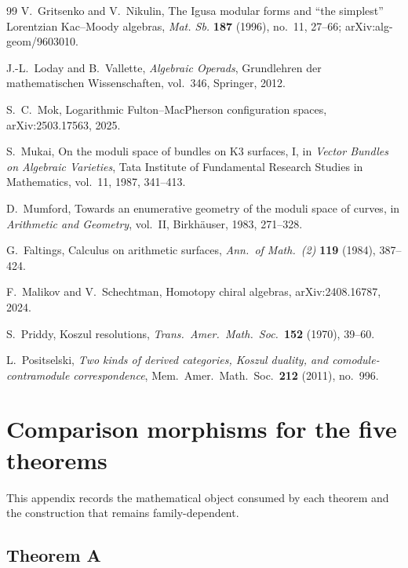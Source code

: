 \documentclass[11pt]{article}
\theoremstyle{plain}
\theoremstyle{definition}
\theoremstyle{remark}
\begin{document}
\begin{thebibliography}{99}
V.~Gritsenko and V.~Nikulin,
The Igusa modular forms and ``the simplest'' Lorentzian
Kac--Moody algebras,
\emph{Mat. Sb.} \textbf{187} (1996), no.~11, 27--66;
arXiv:alg-geom/9603010.

J.-L.~Loday and B.~Vallette,
\emph{Algebraic Operads},
Grundlehren der mathematischen Wissenschaften, vol.~346,
Springer, 2012.

S.~C.~Mok,
Logarithmic Fulton--MacPherson configuration spaces,
arXiv:2503.17563, 2025.

S.~Mukai,
On the moduli space of bundles on K3 surfaces, I,
in \emph{Vector Bundles on Algebraic Varieties}, Tata Institute of
Fundamental Research Studies in Mathematics, vol.~11, 1987,
341--413.

D.~Mumford,
Towards an enumerative geometry of the moduli space of curves,
in \emph{Arithmetic and Geometry}, vol.~II, Birkh\"auser, 1983,
271--328.

G.~Faltings,
Calculus on arithmetic surfaces,
\emph{Ann.\ of Math.\ (2)} \textbf{119} (1984), 387--424.

F.~Malikov and V.~Schechtman,
Homotopy chiral algebras,
arXiv:2408.16787, 2024.

S.~Priddy,
Koszul resolutions,
\emph{Trans.\ Amer.\ Math.\ Soc.}\ \textbf{152} (1970), 39--60.

L.~Positselski,
\emph{Two kinds of derived categories, Koszul duality, and
comodule-contramodule correspondence},
Mem.\ Amer.\ Math.\ Soc.\ \textbf{212} (2011), no.~996.

\end{thebibliography}


\appendix
\section{Comparison morphisms for the five theorems}
\label{sec:five-theorems-ambients}

This appendix records the mathematical object consumed by each
theorem and the construction that remains family-dependent.

\subsection*{Theorem A}
\end{document}

